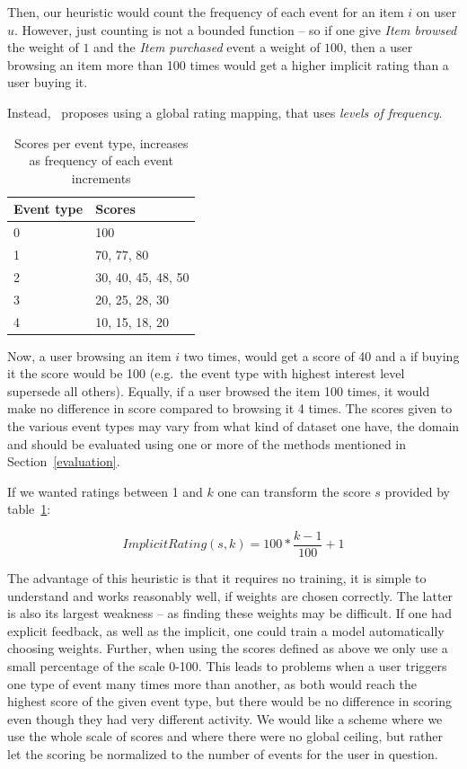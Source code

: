 Then, our heuristic would count the frequency of each event for an item $i$ on
user $u$. However, just counting is not a bounded function – so if one give
\textit{Item browsed} the weight of $1$ and the \textit{Item purchased} event
a weight of $100$, then a user browsing an item more than 100 times would get a
higher implicit rating than a user buying it.

Instead,~\cite{pkghost2014implicit} proposes using a global rating mapping,
that uses \textit{levels of frequency}.

\begin{table}[H]
  \centering
  \begin{tabular}{ll}
  \toprule
  Event type & Scores \\ \midrule
  0 & 100 \\
  1 & 70, 77, 80 \\
  2 & 30, 40, 45, 48, 50 \\
  3 & 20, 25, 28, 30 \\
  4 & 10, 15, 18, 20 \\
  \bottomrule
  \end{tabular}
  \caption{Scores per event type, increases as frequency of each event
           increments}
\label{implicit-table}
\end{table}

Now, a user browsing an item $i$ two times, would get a score of 40 and a if
buying it the score would be 100 (e.g.\ the event type with highest interest
level supersede all others). Equally, if a user browsed the item 100 times, it
would make no difference in score compared to browsing it 4 times. The scores
given to the various event types may vary from what kind of dataset one have,
the domain and should be evaluated using one or more of the methods mentioned
in Section~\ref{evaluation}.

If we wanted ratings between 1 and $k$ one can transform the score $s$ provided
by table~\ref{implicit-table}:

\begin{equation}
  ImplicitRating(s, k) = 100 * \frac{k-1}{100} + 1
\end{equation}

The advantage of this heuristic is that it requires no training, it is simple
to understand and works reasonably well, if weights are chosen correctly.
The latter is also its largest weakness – as finding these weights may be
difficult. If one had explicit feedback, as well as the implicit, one could
train a model automatically choosing weights. Further, when using the scores
defined as above we only use a small percentage of the scale 0-100. This leads
to problems when a user triggers one type of event many times more than
another, as both would reach the highest score of the given event type, but
there would be no difference in scoring even though they had very different
activity. We would like a scheme where we use the whole scale of scores and
where there were no global ceiling, but rather let the scoring be normalized to
the number of events for the user in question.

